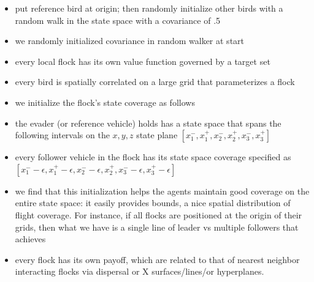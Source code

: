 \begin{itemize}
\item put reference bird at origin; then randomly initialize other birds with a random walk in the state space with a covariance of .5~\cite{LekanCASE2016Paper}
%
\item we randomly initialized covariance in random walker at start
%
\item every local flock has its own value function governed by a target set
%
%
\item every bird is spatially correlated on a large grid that parameterizes a flock
\end{itemize}
%
\begin{itemize}
\item we initialize the flock's state coverage as follows
%
\item the evader (or reference vehicle) holds has a state space that spans the following intervals on the $x,y,z$ state plane
$[x_1^-, x_1^+, x_2^-, x_2^+, x_3^-, x_3^+]$
%
\item every follower vehicle in the flock has its state space coverage specified as
$[x_1^- -\epsilon, x_1^+ - \epsilon, x_2^- -\epsilon, x_2^+, x_3^- -\epsilon, x_3^+ - \epsilon]$
%
\item we find that this initialization helps the agents maintain good coverage on the entire state space: it easily provides bounds, a nice spatial distribution of flight coverage. For instance, if all flocks are positioned at the origin of their grids, then what we have is a single line of leader vs multiple followers that achieves
%
\item every flock has its own payoff, which are related to that of nearest neighbor interacting flocks via dispersal or X surfaces/lines/or hyperplanes.
\end{itemize}


